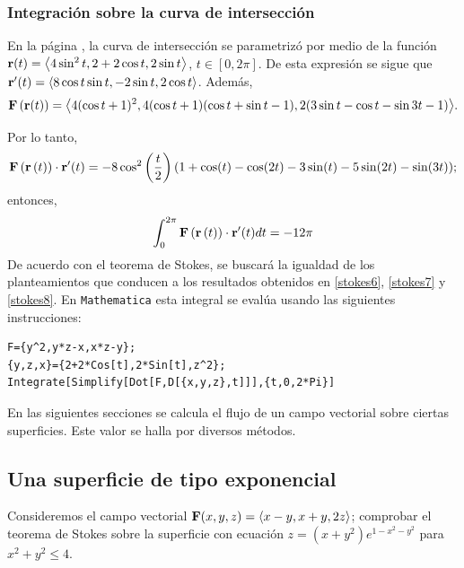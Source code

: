 \subsubsection{Integración sobre la curva de intersección}

En la página \pageref{curvas3}, la curva de intersección se parametrizó  por medio de la función ${\bf r}(t)=\left\langle 4\sin ^{2}t,2+2\cos t,2\sin t\right\rangle$, $t \in [0,2\pi]$.
De esta expresión se sigue que
${\bf r}^{\prime}(t)  = \left\langle 8\cos t\sin t,-2\sin t,2\cos t\right\rangle$. Además,
{\small
\[{\bf F}\left({\bf r}(t) \right) =  \big \langle 4(\cos t+1) ^{2},4(\cos t+1)(\cos t+\sin t-1), 2(3\sin t-\cos t-\sin 3t-1) \big \rangle.\]
}

Por lo tanto,
{\small
\[{\bf F}\left({\bf r}\left(t\right) \right) \cdot {\bf r}^{\prime}(t) = -8\cos ^{2}\left( \frac{t}{2}\right) (1+\cos(t)-\cos(2t)-3\sin(t)-5\sin(2t)-\sin(3t));\]
}
entonces,
\begin{equation}\label{stokes8}
\int_{0}^{2\pi}{\bf F}\left({\bf r}\left(t\right) \right) \cdot {\bf r}^{\prime}(t)dt
= -12\pi
\end{equation}
De acuerdo con el teorema de Stokes, se buscará la igualdad de los planteamientos que conducen a los resultados obtenidos en \ref{stokes6}, \ref{stokes7} y \ref{stokes8}.
En \verb"Mathematica" esta integral se evalúa usando las siguientes instrucciones:

\begin{tcolorbox}[title=\bf Instrucción \verb"Mathematica"]\begin{Verbatim}[formatcom=\letraverbatim]
F={y^2,y*z-x,x*z-y};
{y,z,x}={2+2*Cos[t],2*Sin[t],z^2};
Integrate[Simplify[Dot[F,D[{x,y,z},t]]],{t,0,2*Pi}]
\end{Verbatim}
\end{tcolorbox}

En las siguientes secciones se calcula el flujo de un campo vectorial sobre ciertas superficies.
Este valor se halla por diversos métodos.

\subsection{Una superficie de tipo exponencial}

Consideremos el campo vectorial ${\bf F}(x,y,z) = \left \langle x-y,x+y,2z \right \rangle$; comprobar el teorema de Stokes sobre la superficie con ecuación $z=(x+y^2)e^{1-x^2-y^2}$ para $x^2+y^2\leq 4$.


